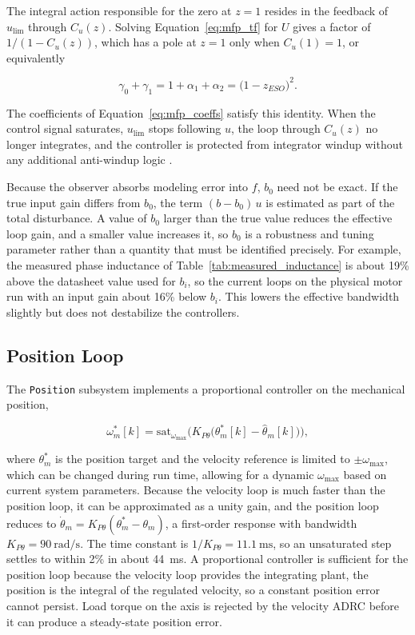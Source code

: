 The integral action responsible for the zero at $z = 1$ resides in the feedback of $u_{\mathrm{lim}}$ through $C_u(z)$. Solving Equation~\eqref{eq:mfp_tf} for $U$ gives a factor of $1/(1 - C_u(z))$, which has a pole at $z = 1$ only when $C_u(1) = 1$, or equivalently

\begin{equation}
	\gamma_0 + \gamma_1 = 1 + \alpha_1 + \alpha_2 = \big( 1 - z_{ESO} \big)^{2}.
	\label{eq:integral_condition}
\end{equation}

The coefficients of Equation~\eqref{eq:mfp_coeffs} satisfy this identity. When the control signal saturates, $u_{\mathrm{lim}}$ stops following $u$, the loop through $C_u(z)$ no longer integrates, and the controller is protected from integrator windup without any additional anti-windup logic \cite{herbst_tuning_2023}.

Because the observer absorbs modeling error into $f$, $b_0$ need not be exact. If the true input gain differs from $b_0$, the term $(b - b_0)\,u$ is estimated as part of the total disturbance. A value of $b_0$ larger than the true value reduces the effective loop gain, and a smaller value increases it, so $b_0$ is a robustness and tuning parameter rather than a quantity that must be identified precisely. For example, the measured phase inductance of Table~\ref{tab:measured_inductance} is about 19\% above the datasheet value used for $b_i$, so the current loops on the physical motor run with an input gain about 16\% below $b_i$. This lowers the effective bandwidth slightly but does not destabilize the controllers.

\subsection{Position Loop}\label{sec:positionLoop}

The \texttt{Position} subsystem implements a proportional controller on the mechanical position,

\begin{equation}
	\omega_m^{*}[k] = \mathrm{sat}_{\omega_{\max}} \Big(
	K_{P\theta} \big( \theta_m^{*}[k] - \hat{\theta}_m[k] \big) \Big),
	\label{eq:position_loop}
\end{equation}


where $\theta_m^{*}$ is the position target and the velocity reference is limited to $\pm\omega_{\max}$, which can be changed during run time, allowing for a dynamic $\omega_{\max}$ based on current system parameters. Because the velocity loop is much faster than the position loop, it can be approximated as a unity gain, and the position loop reduces to $\dot{\theta}_m = K_{P\theta} (\theta_m^{*} - \theta_m)$, a first-order response with bandwidth $K_{P\theta} = \SI{90}{\radian\per\second}$. The time constant is $1/K_{P\theta} = \SI{11.1}{\milli\second}$, so an unsaturated step settles to within 2\% in about \SI{44}{\milli\second}. A proportional controller is sufficient for the position loop because the velocity loop provides the integrating plant, the position is the integral of the regulated velocity, so a constant position error cannot persist. Load torque on the axis is rejected by the velocity ADRC before it can produce a steady-state position error.

